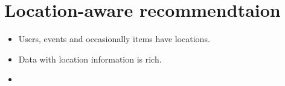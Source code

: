 \chapter{Location-aware recommendtaion}
\begin{itemize}
\item Users, events and occasionally items have locations.
\item Data with location information is rich.
\item  
\end{itemize}
